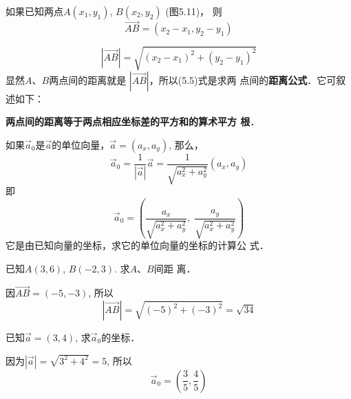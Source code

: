 如果已知两点$A(x_1,y_1)$, $B(x_2,y_2)$ (图5.11)，
则
\[\Vec{AB}=(x_2-x_1,y_2-y_1)\]

\begin{figure}[htp]
    \centering
{}
    \caption{}
\end{figure}


\begin{equation}
    |\Vec{AB}|=\sqrt{(x_2-x_1)^2+(y_2-y_1)^2}
\end{equation}
显然$A$、$B$两点间的距离就是
$|\Vec{AB}|$，所以(5.5)式是求两
点间的\textbf{距离公式}．它可叙述如下：

\textbf{两点间的距离等于两点相应坐标差的平方和的算术平方
根}．

如果$\vec{a}_0$是$\vec{a}$的单位向量，$\vec{a}=(a_x,a_y)$, 
那么，
\[\vec{a}_0=\frac{1}{|\vec{a}|}\vec{a}=\frac{1}{\sqrt{a^2_x+a^2_y}}(a_x,a_y)\]
即
\begin{equation}
    \vec{a}_0=\left(\frac{a_x}{\sqrt{a^2_x+a^2_y}},\; \frac{a_y}{\sqrt{a^2_x+a^2_y}}\right)
\end{equation}
它是由已知向量的坐标，求它的单位向量的坐标的计算公
式．

\begin{example}
    已知$A(3,6)$, $B(-2,3)$. 求$A$、$B$间距
离．
\end{example}

\begin{solution}
    因$\Vec{AB}=(-5,-3)$, 所以
\[|\Vec{AB}|=\sqrt{(-5)^2+(-3)^2}=\sqrt{34}\]
\end{solution}


\begin{example}
    已知$\vec{a}=(3,4)$, 求$\vec{a}_0$的坐标．
\end{example}

\begin{solution}
因为$|\vec{a}|=\sqrt{3^2+4^2}=5$, 所以
\[\vec{a}_0=\left(\frac{3}{5},\frac{4}{5}\right)\]
\end{solution}

